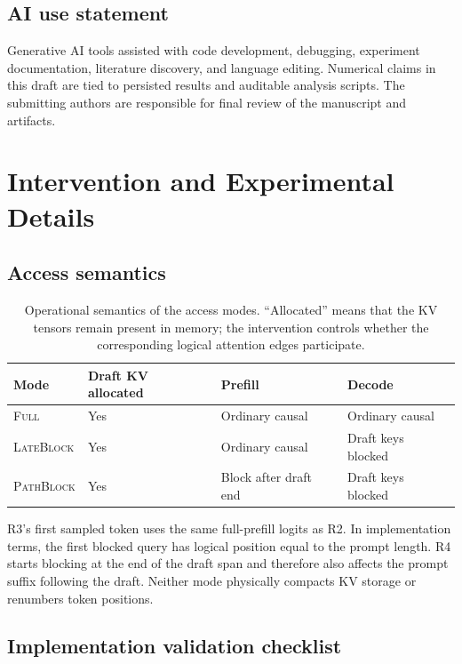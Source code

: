 \documentclass{article}
\newcommand{\fullaccess}{\textsc{Full}}
\newcommand{\lateblock}{\textsc{LateBlock}}
\newcommand{\pathblock}{\textsc{PathBlock}}
\begin{document}
\subsection*{AI use statement}
Generative AI tools assisted with code development, debugging, experiment documentation, literature discovery, and language editing. Numerical claims in this draft are tied to persisted results and auditable analysis scripts. The submitting authors are responsible for final review of the manuscript and artifacts.




\appendix

\section{Intervention and Experimental Details}
\label{app:details}

\subsection{Access semantics}

\begin{table}[h]
\caption{Operational semantics of the access modes. ``Allocated'' means that the KV tensors remain present in memory; the intervention controls whether the corresponding logical attention edges participate.}
\centering
\small
\begin{tabular}{llll}
\toprule
Mode & Draft KV allocated & Prefill & Decode \\
\midrule
\fullaccess & Yes & Ordinary causal & Ordinary causal \\
\lateblock & Yes & Ordinary causal & Draft keys blocked \\
\pathblock & Yes & Block after draft end & Draft keys blocked \\
\bottomrule
\end{tabular}
\end{table}

R3's first sampled token uses the same full-prefill logits as R2. In implementation terms, the first blocked query has logical position equal to the prompt length. R4 starts blocking at the end of the draft span and therefore also affects the prompt suffix following the draft. Neither mode physically compacts KV storage or renumbers token positions.

\subsection{Implementation validation checklist}
\end{document}
